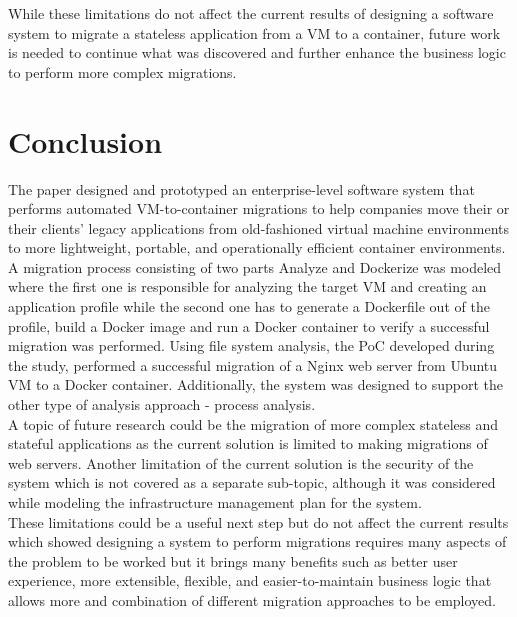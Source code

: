 \documentclass[twocolumn]{article}
\begin{document}
While these limitations do not affect the current results of designing a software system to migrate a stateless application from a VM to a container, future work is needed to continue what was discovered and further enhance the business logic to perform more complex migrations.

\section{Conclusion}
The paper designed and prototyped an enterprise-level software system that performs automated VM-to-container migrations to help companies move their or their clients' legacy applications from old-fashioned virtual machine environments to more lightweight, portable, and operationally efficient container environments. \\

A migration process consisting of two parts Analyze and Dockerize was modeled where the first one is responsible for analyzing the target VM and creating an application profile while the second one has to generate a Dockerfile out of the profile, build a Docker image and run a Docker container to verify a successful migration was performed. Using file system analysis, the PoC developed during the study, performed a successful migration of a Nginx web server from Ubuntu VM to a Docker container. Additionally, the system was designed to support the other type of analysis approach - process analysis. \\

A topic of future research could be the migration of more complex stateless and stateful applications as the current solution is limited to making migrations of web servers. Another limitation of the current solution is the security of the system which is not covered as a separate sub-topic, although it was considered while modeling the infrastructure management plan for the system. \\

These limitations could be a useful next step but do not affect the current results which showed designing a system to perform migrations requires many aspects of the problem to be worked but it brings many benefits such as better user experience, more extensible, flexible, and easier-to-maintain business logic that allows more and combination of different migration approaches to be employed.
\end{document}
